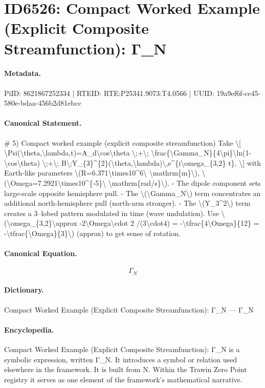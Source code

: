 \section*{ID6526: Compact Worked Example (Explicit Composite Streamfunction): Γ\_N}
\paragraph{Metadata.}
PiID: 8621867252334 | RTEID: RTE:P25341.9073:T4.0566 | UUID: 19a9ef6f-ce45-580e-bdaa-456b2d81ebcc

\paragraph{Canonical Statement.}
\# 5) Compact worked example (explicit composite streamfunction) Take \textbackslash{}[ \textbackslash{}Psi(\textbackslash{}theta,\textbackslash{}lambda,t)=A\_d\textbackslash{}cos\textbackslash{}theta \textbackslash{};+\textbackslash{}; \textbackslash{}frac\{\textbackslash{}Gamma\_N\}\{4\textbackslash{}pi\}\textbackslash{}ln(1-\textbackslash{}cos\textbackslash{}theta) \textbackslash{};+\textbackslash{}; B\textbackslash{};Y\_\{3\}\textasciicircum{}\{2\}(\textbackslash{}theta,\textbackslash{}lambda)\textbackslash{},e\textasciicircum{}\{i\textbackslash{}omega\_\{3,2\} t\}, \textbackslash{}] with Earth-like parameters \textbackslash{}(R=6.371\textbackslash{}times10\textasciicircum{}6\textbackslash{} \textbackslash{}mathrm\{m\}\textbackslash{}), \textbackslash{}(\textbackslash{}Omega=7.2921\textbackslash{}times10\textasciicircum{}\{-5\}\textbackslash{} \textbackslash{}mathrm\{rad/s\}\textbackslash{}). - The dipole component sets large-scale opposite hemisphere pull. - The \textbackslash{}(\textbackslash{}Gamma\_N\textbackslash{}) term concentrates an additional north-hemisphere pull (north-arm stronger). - The \textbackslash{}(Y\_3\textasciicircum{}2\textbackslash{}) term creates a 3–lobed pattern modulated in time (wave undulation). Use \textbackslash{}(\textbackslash{}omega\_\{3,2\}\textbackslash{}approx -2\textbackslash{}Omega\textbackslash{}cdot 2 /(3\textbackslash{}cdot4) = -\textbackslash{}tfrac\{4\textbackslash{}Omega\}\{12\} = -\textbackslash{}tfrac\{\textbackslash{}Omega\}\{3\}\textbackslash{}) (approx) to get sense of rotation.

\paragraph{Canonical Equation.}
\[
\Gamma_N
\]

\paragraph{Dictionary.}
Compact Worked Example (Explicit Composite Streamfunction): Γ\_N — Γ\_N

\paragraph{Encyclopedia.}
Compact Worked Example (Explicit Composite Streamfunction): Γ\_N is a symbolic expression, written Γ\_N. It introduces a symbol or relation used elsewhere in the framework. It is built from N. Within the Trawin Zero Point registry it serves as one element of the framework's mathematical narrative.
